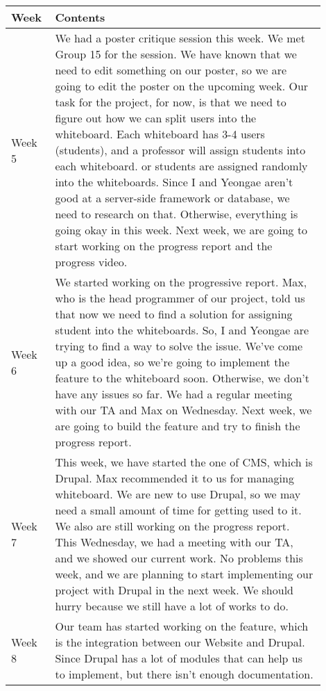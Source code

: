 \documentclass[10pt]{article}
\begin{document}
\begin{center}
            \begin{tabular}{ | p{0.1\linewidth} | p{0.8\linewidth} | } \hline
                Week & Contents  \\ \hline
                Week 5 &We had a poster critique session this week. We met Group 15 for the session.
                We have known that we need to edit something on our poster, so we are going to edit the poster on
                the upcoming week.
                Our task for the project, for now, is that we need to figure out how we can split users into the whiteboard.
                Each whiteboard has 3-4 users (students), and a professor will assign students into each whiteboard.
                or students are assigned randomly into the whiteboards.
                Since I and Yeongae aren't good at a server-side framework or database, we need to research on that.
                Otherwise, everything is going okay in this week.
                Next week, we are going to start working on the progress report and the progress video.\\ \hline
                Week 6 & We started working on the progressive report.
                Max, who is the head programmer of our project, told us that now we need to find a solution for assigning student into the whiteboards.
                So, I and Yeongae are trying to find a way to solve the issue.
                We've come up a good idea, so we're going to implement the feature to the whiteboard soon.
                Otherwise, we don't have any issues so far.
                We had a regular meeting with our TA and Max on Wednesday.
                Next week, we are going to build the feature and try to finish the progress report.   \\ \hline
                Week 7 &  This week, we have started the one of CMS, which is Drupal.
                Max recommended it to us for managing whiteboard.
                We are new to use Drupal, so we may need a small amount of time for getting used to it.
                We also are still working on the progress report.
                This Wednesday, we had a meeting with our TA, and we showed our current work.
                No problems this week, and we are planning to start implementing our project with Drupal in the next week.
                We should hurry because we still have a lot of works to do. \\ \hline
                Week 8 & Our team has started working on the feature, which is the integration between our Website and Drupal.
                Since Drupal has a lot of modules that can help us to implement, but there isn't enough documentation.

\end{tabular}
\end{center}
\end{document}
